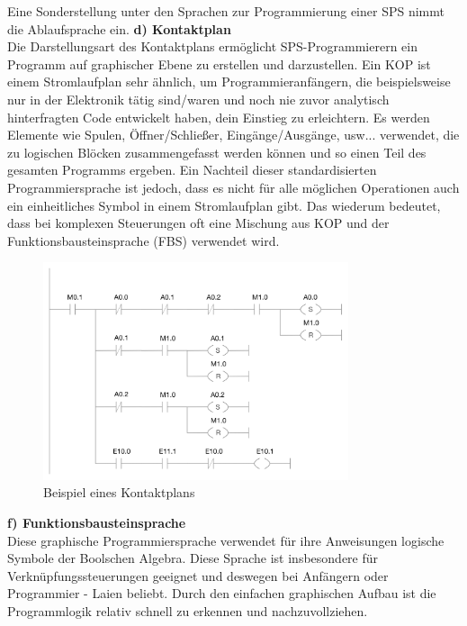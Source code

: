 	Eine Sonderstellung unter den Sprachen zur Programmierung einer SPS nimmt die Ablaufsprache ein.
	\textbf{d) Kontaktplan}\\
	Die Darstellungsart des Kontaktplans ermöglicht SPS-Programmierern ein Programm auf graphischer Ebene zu erstellen und darzustellen. Ein KOP ist einem Stromlaufplan sehr ähnlich, um Programmieranfängern, die beispielsweise nur in der Elektronik tätig sind/waren und noch nie zuvor analytisch hinterfragten Code entwickelt haben, dein Einstieg zu erleichtern. Es werden Elemente wie Spulen, Öffner/Schließer, Eingänge/Ausgänge, usw... verwendet, die zu logischen Blöcken zusammengefasst werden können und so einen Teil des gesamten Programms ergeben. Ein Nachteil dieser standardisierten Programmiersprache ist jedoch, dass es nicht für alle möglichen Operationen auch ein einheitliches Symbol in einem Stromlaufplan gibt. Das wiederum bedeutet, dass bei komplexen Steuerungen oft eine Mischung aus KOP und der Funktionsbausteinsprache (FBS) verwendet wird.
	\begin{figure}[h!]
  		\centering
    	\includegraphics[width=0.8\textwidth]{graphics/stateoftheart/kop_Selfmade.png}
  		\caption{Beispiel eines Kontaktplans \cite{kontaktplan}}
	\end{figure}

	\newpage
	\textbf{f) Funktionsbausteinsprache}\\

	Diese graphische Programmiersprache verwendet für ihre Anweisungen logische Symbole der Boolschen Algebra. Diese Sprache ist insbesondere für Verknüpfungssteuerungen geeignet und deswegen bei Anfängern oder Programmier - Laien beliebt. Durch den einfachen graphischen Aufbau ist die Programmlogik relativ schnell zu erkennen und nachzuvollziehen.

